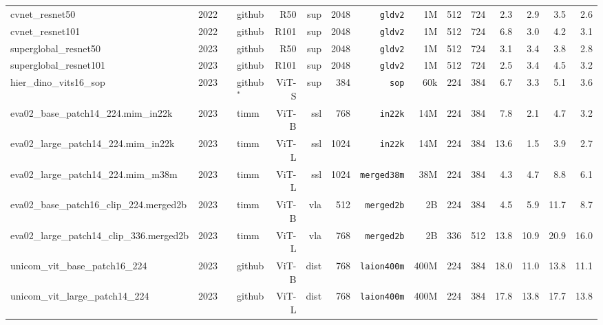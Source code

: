 \begin{tabular}{llllrrrrrrrRRRR}
cvnet\_resnet50                                   & 2022 & \cite{lsl+22}            & github      & R50   & sup      & 2048 & \texttt{gldv2}     & 1M   & 512 & 724 & 2.3  & 2.9 & 3.5   & 2.6  \\
cvnet\_resnet101                                  & 2022 & \cite{lsl+22}            & github      & R101  & sup      & 2048 & \texttt{gldv2}     & 1M   & 512 & 724 & 6.8  & 3.0 & 4.2   & 3.1  \\
superglobal\_resnet50                             & 2023 & \cite{sck+23}            & github      & R50   & sup      & 2048 & \texttt{gldv2}     & 1M   & 512 & 724 & 3.1  & 3.4 & 3.8   & 2.8  \\
superglobal\_resnet101                            & 2023 & \cite{sck+23}            & github      & R101  & sup      & 2048 & \texttt{gldv2}     & 1M   & 512 & 724 & 2.5  & 3.4 & 4.5   & 3.2  \\
hier\_dino\_vits16\_sop                           & 2023 & \cite{kjk23}             & github$^*$  & ViT-S & sup      & 384  & \texttt{sop}       & 60k  & 224 & 384 & 6.7  & 3.3 & 5.1   & 3.6  \\
eva02\_base\_patch14\_224.mim\_in22k              & 2023 & \cite{fwx+23}            & timm        & ViT-B & ssl      & 768  & \texttt{in22k}     & 14M  & 224 & 384 & 7.8  & 2.1 & 4.7   & 3.2  \\
eva02\_large\_patch14\_224.mim\_in22k             & 2023 & \cite{fwx+23}            & timm        & ViT-L & ssl      & 1024 & \texttt{in22k}     & 14M  & 224 & 384 & 13.6 & 1.5  & 3.9  & 2.7  \\
eva02\_large\_patch14\_224.mim\_m38m              & 2023 & \cite{fwx+23}            & timm        & ViT-L & ssl      & 1024 & \texttt{merged38m} & 38M  & 224 & 384 & 4.3  & 4.7  & 8.8  & 6.1  \\
eva02\_base\_patch16\_clip\_224.merged2b          & 2023 & \cite{fwx+23,evaclip}    & timm        & ViT-B & vla      & 512  & \texttt{merged2b}  & 2B   & 224 & 384 & 4.5  & 5.9  & 11.7 & 8.7  \\
eva02\_large\_patch14\_clip\_336.merged2b         & 2023 & \cite{fwx+23,evaclip}    & timm        & ViT-L & vla      & 768  & \texttt{merged2b}  & 2B   & 336 & 512 & 13.8 & 10.9 & 20.9 & 16.0 \\
unicom\_vit\_base\_patch16\_224                   & 2023 & \cite{ady+23}            & github      & ViT-B & dist     & 768  & \texttt{laion400m} & 400M & 224 & 384 & 18.0 & 11.0 & 13.8 & 11.1 \\
unicom\_vit\_large\_patch14\_224                  & 2023 & \cite{ady+23}            & github      & ViT-L & dist     & 768  & \texttt{laion400m} & 400M & 224 & 384 & 17.8 & 13.8 & 17.7 & 13.8 \\

\end{tabular}
